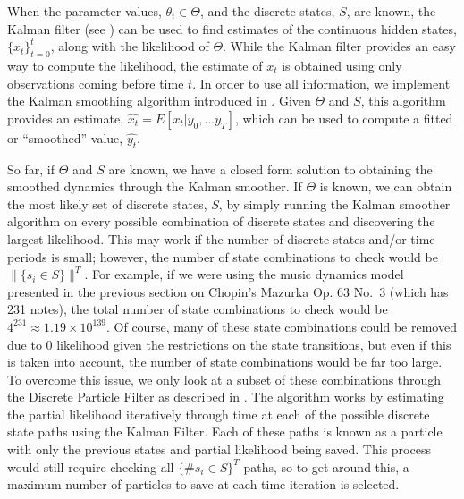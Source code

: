 \documentclass[12pt]{article}
\begin{document}
When the parameter values, \(\theta_i \in \Theta\), and the discrete
states, \(S\), are known, the Kalman filter (see
\citet{kalman_new_1960}) can be used to find estimates of the continuous
hidden states, \(\{x_t\}_{t=0}^t\), along with the likelihood of
\(\Theta\). While the Kalman filter provides an easy way to compute the
likelihood, the estimate of \(x_t\) is obtained using only observations
coming before time \(t\). In order to use all information, we implement
the Kalman smoothing algorithm introduced in \citet{rauch_maximum_1965}.
Given \(\Theta\) and \(S\), this algorithm provides an estimate,
\(\hat{x_t} = E[x_t|y_0,...y_T]\), which can be used to compute a fitted
or ``smoothed'' value, \(\hat{y_t}\).

So far, if \(\Theta\) and \(S\) are known, we have a closed form
solution to obtaining the smoothed dynamics through the Kalman smoother.
If \(\Theta\) is known, we can obtain the most likely set of discrete
states, \(S\), by simply running the Kalman smoother algorithm on every
possible combination of discrete states and discovering the largest
likelihood. This may work if the number of discrete states and/or time
periods is small; however, the number of state combinations to check
would be \(\|\{s_i \in S\}\|^T\). For example, if we were using the
music dynamics model presented in the previous section on Chopin's
Mazurka Op. 63 No.~3 (which has 231 notes), the total number of state
combinations to check would be \(4^{231}\approx1.19\times 10^{139}\). Of
course, many of these state combinations could be removed due to 0
likelihood given the restrictions on the state transitions, but even if
this is taken into account, the number of state combinations would be
far too large. To overcome this issue, we only look at a subset of these
combinations through the Discrete Particle Filter as described in
\citet{mcdonald_markov-switching_2019}. The algorithm works by
estimating the partial likelihood iteratively through time at each of
the possible discrete state paths using the Kalman Filter. Each of these
paths is known as a particle with only the previous states and partial
likelihood being saved. This process would still require checking all
\(\{\#s_i \in S\}^T\) paths, so to get around this, a maximum number of
particles to save at each time iteration is selected.
\end{document}
